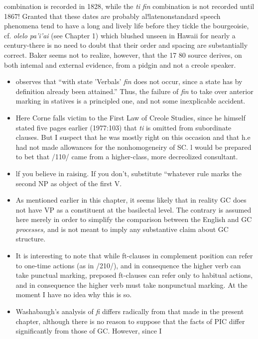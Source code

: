 \begin{itemize}
\begin{itemize}
\begin{itemize}
\begin{itemize}

combination is recorded in 1828, while the \textit{ti} \textit{fin} combination is not recorded until 1867! Granted that these dates are probably al!late\-nonstandard speech phenomena tend to have a long and lively life before they tickle the bourgeoisie, cf. \textit{olelo} \textit{pa'i'ai} (see Chapter 1) which blushed unseen in Hawaii for nearly a century-there is no need to doubt that their order and spacing are substantially correct. Baker seems not to realize, however, that the 17 80 source derives, on both intemal and external evidence, from a pidgin and not a creole speaker.

\begin{itemize}
\item \citet{Corne1981} observes that ``with state 'Verbals' \textit{fin} does not occur, since a state has by definition already been attained.'' Thus, the failure of \textit{fin} to take over anterior marking in statives is a principled one, and not some inexplicable accident.
\item Here Corne falls victim to the First Law of Creole Studies, since he himself stated five pages earlier (1977:103) that \textit{ti} is omitted from subordinate clauses. But I suspect that he was mostly right on this occasion and that h.e had not made allowances for the nonhomogeneiry of SC. l would be prepared to bet that /110/ came from a higher-class, more decreolized consultant.
\item lf you believe in raising. If you don't, substitute ``whatever rule marks the second NP as object of the first V.{\textquotedbl}
\item As mentioned earlier in this chapter, it seems likely that in reality GC does not have VP as a constituent at the basilectal level. The contrary is assumed here merely in order to simplify the com\-parison between the English and GC \textit{processes,} and is not meant to imply any substantive claim about GC structure.
\item It is interesting to note that while ft-clauses in complement position can refer to one-time actions (as in /210/), and in consequence the higher verb can take punctual marking, preposed ft-clauses can refer only to habitual actions, and in consequence the higher verb must take nonpunctual marking. At the moment I have no idea why this is so.
\item Washabaugh's analysis of \textit{fi} differs radically from that made in the present chapter, although there is no reason to suppose that the facts of PIC differ significantly from those of GC. However, since I
\end{itemize}


\end{itemize}
\end{itemize}
\end{itemize}
\end{itemize}
